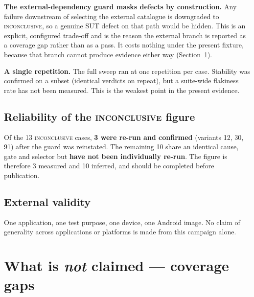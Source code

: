 \documentclass[11pt,a4paper]{article}
\begin{document}
\textbf{The external-dependency guard masks defects by construction.} Any failure
downstream of selecting the external catalogue is downgraded to
\textsc{inconclusive}, so a genuine SUT defect on that path would be hidden. This
is an explicit, configured trade-off and is the reason the external branch is
reported as a coverage gap rather than as a pass. It costs nothing under the
present fixture, because that branch cannot produce evidence either way
(Section~\ref{sec:gaps}).

\textbf{A single repetition.} The full sweep ran at one repetition per case.
Stability was confirmed on a subset (identical verdicts on repeat), but a
suite-wide flakiness rate has not been measured. This is the weakest point in the
present evidence.

\subsection*{Reliability of the \textsc{inconclusive} figure}
Of the 13 \textsc{inconclusive} cases, \textbf{3 were re-run and confirmed}
(variants 12, 30, 91) after the guard was reinstated. The remaining 10 share an
identical cause, gate and selector but \textbf{have not been individually re-run}.
The figure is therefore 3 measured and 10 inferred, and should be completed before
publication.

\subsection*{External validity}
One application, one test purpose, one device, one Android image. No claim of
generality across applications or platforms is made from this campaign alone.

\section{What is \emph{not} claimed --- coverage gaps}
\label{sec:gaps}
\end{document}
